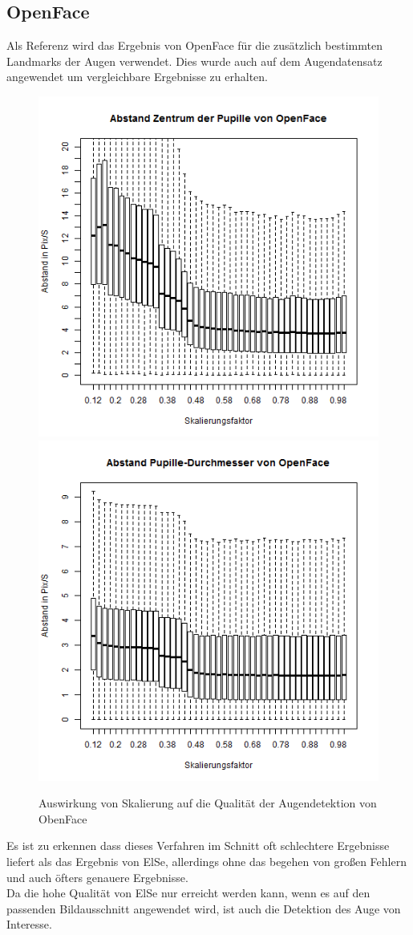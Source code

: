 \subsection{OpenFace}
Als Referenz wird das Ergebnis von OpenFace für die zusätzlich bestimmten Landmarks der Augen verwendet. Dies wurde auch auf dem Augendatensatz \cite{database_Eye} angewendet um vergleichbare Ergebnisse zu erhalten.\\
\begin{figure}
	\centering
	\includegraphics[width=0.45\linewidth]{Eye_Img_Box/Openface_PC}
	\includegraphics[width=0.45\linewidth]{Eye_Img_Box/Openface_PW}
	\caption{Auswirkung von Skalierung auf die Qualität der Augendetektion von ObenFace}
	\label{OpenFace_Eye}
\end{figure}
Es ist zu erkennen dass dieses Verfahren im Schnitt oft schlechtere Ergebnisse liefert als das Ergebnis von ElSe, allerdings ohne das begehen von großen Fehlern und auch öfters genauere Ergebnisse.\\
Da die hohe Qualität von ElSe nur erreicht werden kann, wenn es auf den passenden Bildausschnitt angewendet wird, ist auch die Detektion des Auge von Interesse.\\
